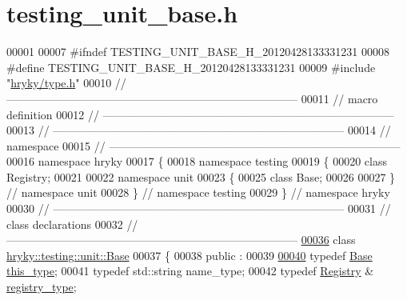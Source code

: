 \hypertarget{testing__unit__base_8h_source}{\section{testing\-\_\-unit\-\_\-base.\-h}
}

\begin{DoxyCode}
00001 
00007 \textcolor{preprocessor}{#ifndef TESTING\_UNIT\_BASE\_H\_20120428133331231}
00008 \textcolor{preprocessor}{}\textcolor{preprocessor}{#define TESTING\_UNIT\_BASE\_H\_20120428133331231}
00009 \textcolor{preprocessor}{}\textcolor{preprocessor}{#include "\hyperlink{type_8h}{hryky/type.h}"}
00010 \textcolor{comment}{//
      ------------------------------------------------------------------------------}
00011 \textcolor{comment}{// macro definition}
00012 \textcolor{comment}{//
      ------------------------------------------------------------------------------}
00013 \textcolor{comment}{//
      ------------------------------------------------------------------------------}
00014 \textcolor{comment}{// namespace}
00015 \textcolor{comment}{//
      ------------------------------------------------------------------------------}
00016 \textcolor{keyword}{namespace }hryky
00017 \{
00018 \textcolor{keyword}{namespace }testing
00019 \{
00020     \textcolor{keyword}{class }Registry;
00021 
00022 \textcolor{keyword}{namespace }unit
00023 \{
00025     \textcolor{keyword}{class }Base;
00026 
00027 \} \textcolor{comment}{// namespace unit}
00028 \} \textcolor{comment}{// namespace testing}
00029 \} \textcolor{comment}{// namespace hryky}
00030 \textcolor{comment}{//
      ------------------------------------------------------------------------------}
00031 \textcolor{comment}{// class declarations}
00032 \textcolor{comment}{//
      ------------------------------------------------------------------------------}
\hypertarget{testing__unit__base_8h_source_l00036}{}\hyperlink{classhryky_1_1testing_1_1unit_1_1_base}{00036} \textcolor{comment}{}\textcolor{keyword}{class }\hyperlink{classhryky_1_1testing_1_1unit_1_1_base}{hryky::testing::unit::Base}
00037 \{
00038 \textcolor{keyword}{public} :
00039 
\hypertarget{testing__unit__base_8h_source_l00040}{}\hyperlink{classhryky_1_1testing_1_1unit_1_1_base_a5424efb7b586101378315945147e85ef}{00040}     \textcolor{keyword}{typedef} \hyperlink{classhryky_1_1testing_1_1unit_1_1_base}{Base}        \hyperlink{classhryky_1_1testing_1_1unit_1_1_base_a5424efb7b586101378315945147e85ef}{this_type};
00041     \textcolor{keyword}{typedef} std::string name\_type;
00042     \textcolor{keyword}{typedef} \hyperlink{classhryky_1_1testing_1_1_registry}{Registry} &  \hyperlink{classhryky_1_1testing_1_1_registry}{registry_type};

\end{DoxyCode}

